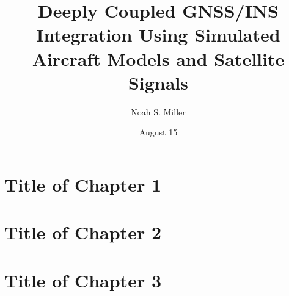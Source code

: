 \documentclass[12pt]{report}
\title{Deeply Coupled GNSS/INS Integration Using Simulated Aircraft Models and Satellite Signals}
\author{Noah S. Miller}
\date{August 15}
\begin{document}
\begin{romanpages}      %

  \TitlePage

  

  

  \begin{singlespace}

    \begin{center}
      \renewcommand{\cftchapfont}{}
      \renewcommand{\cftchappagefont}{}
      \renewcommand{\cfttoctitlefont}{\normalsize}%
      \renewcommand{\cftsecfont }{\normalsize}%
      \renewcommand{\cftsecpagefont}{\normalsize}%
      \tableofcontents
      \newpage
      \renewcommand{\cftchapfont}{}
      \renewcommand{\cftchappagefont}{}
      \renewcommand{\cftloftitlefont}{\normalsize}%
      \renewcommand{\cftsecfont}{\normalsize}%
      \renewcommand{\cftsecpagefont}{\normalsize}%
      \listoffigures
      \newpage
      \renewcommand{\cftchapfont}{}
      \renewcommand{\cftchappagefont}{}
      \renewcommand{\cftlottitlefont}{\normalsize}%
      \renewcommand{\cftsecfont}{\normalsize}%
      \renewcommand{\cftsecpagefont}{\normalsize}%
      \listoftables
    \end{center}
  \end{singlespace}

  \printnomenclature[0.5in]
\end{romanpages}

\normalem

\chapter {Title of Chapter 1}


\chapter {Title of Chapter 2}


\chapter {Title of Chapter 3}

\end{document}
